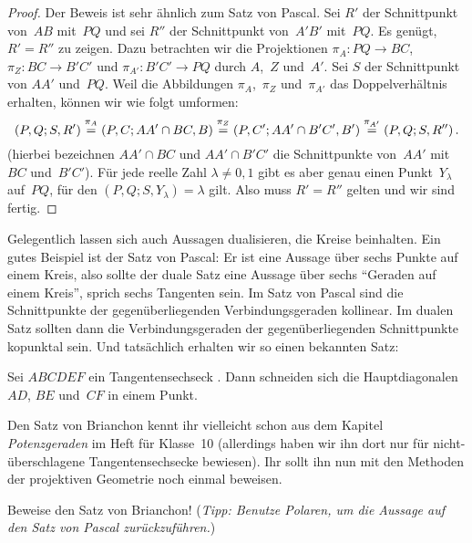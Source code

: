 \begin{proof}
	Der Beweis ist sehr ähnlich zum Satz von Pascal. Sei $R'$ der Schnittpunkt von~$AB$ mit~$PQ$ und sei $R''$ der Schnittpunkt von~$A'B'$ mit~$PQ$. Es genügt, $R'=R''$ zu zeigen. Dazu betrachten wir die Projektionen $\pi_A\colon PQ\to BC$, $\pi_Z\colon BC\to B'C'$ und $\pi_{A'}\colon B'C'\to PQ$ durch $A$,~$Z$ und~$A'$. Sei $S$ der Schnittpunkt von $AA'$ und~$PQ$. Weil die Abbildungen $\pi_A$,~$\pi_Z$ und~$\pi_{A'}$ das Doppelverhältnis erhalten, können wir wie folgt umformen:
	\begin{equation*}
		(P,Q;S,R')\overset{\raisebox{0.5ex}{$\scriptstyle\pi_A$}}{=} (P,C;AA'\cap BC,B)\overset{\raisebox{0.5ex}{$\scriptstyle\pi_Z$}}{=} (P,C';AA'\cap B'C',B')\overset{\raisebox{0.5ex}{$\scriptstyle\pi_{A'}$}}{=} (P,Q;S,R'')\,.
	\end{equation*}
	(hierbei bezeichnen $AA'\cap BC$ und $AA'\cap B'C'$ die Schnittpunkte von~$AA'$ mit $BC$ und~$B'C'$). Für jede reelle Zahl $\lambda\neq 0,1$ gibt es aber genau einen Punkt~$Y_\lambda$ auf~$PQ$, für den $(P,Q;S,Y_\lambda)=\lambda$ gilt. Also muss $R'=R''$ gelten und wir sind fertig.
\end{proof}

Gelegentlich lassen sich auch Aussagen dualisieren, die Kreise beinhalten. Ein gutes Beispiel ist der Satz von Pascal: Er ist eine Aussage über sechs Punkte auf einem Kreis, also sollte der duale Satz eine Aussage über sechs \enquote{Geraden auf einem Kreis}, sprich sechs Tangenten sein. Im Satz von Pascal sind die Schnittpunkte der gegenüberliegenden Verbindungsgeraden kollinear. Im dualen Satz sollten dann die Verbindungsgeraden der gegenüberliegenden Schnittpunkte kopunktal sein. Und tatsächlich erhalten wir so einen bekannten Satz:
\begin{satzmitnamen}
	Sei $ABCDEF$ ein Tangentensechseck . Dann schneiden sich die Hauptdiagonalen $AD$, $BE$ und~$CF$ in einem Punkt.
\end{satzmitnamen}

Den Satz von Brianchon kennt ihr vielleicht schon aus dem Kapitel \emph{Potenzgeraden} im Heft für Klasse~10 (allerdings haben wir ihn dort nur für nicht-überschlagene Tangentensechsecke bewiesen). Ihr sollt ihn nun mit den Methoden der projektiven Geometrie noch einmal beweisen.

\begin{aufgabe*}
	Beweise den Satz von Brianchon! (\emph{Tipp: Benutze Polaren, um die Aussage auf den Satz von Pascal zurückzuführen.})
\end{aufgabe*}

